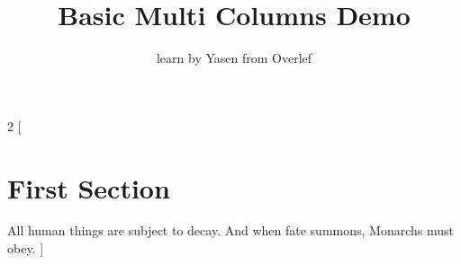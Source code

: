\documentclass[]{article}
\title{Basic Multi Columns Demo}
\author{learn by Yasen from Overlef}
\begin{document}
	
	\maketitle
	
	\begin{multicols}{2}
		[
		\section{First Section}
		All human things are subject to decay. And when fate summons, Monarchs must obey.
		]
		\blindtext\blindtext
	\end{multicols}
	
\end{document}

